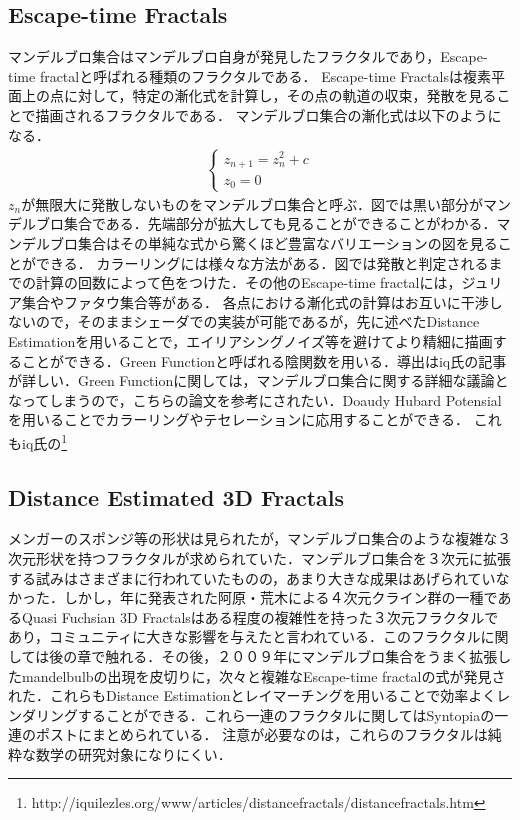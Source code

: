 \subsection{Escape-time Fractals}
マンデルブロ集合はマンデルブロ自身が発見したフラクタルであり，Escape-time fractalと呼ばれる種類のフラクタルである．
Escape-time Fractalsは複素平面上の点に対して，特定の漸化式を計算し，その点の軌道の収束，発散を見ることで描画されるフラクタルである．
マンデルブロ集合の漸化式は以下のようになる．
\begin{eqnarray*}
 \begin{cases}
  z_{n+1} = z^2_{n} + c \\ z_0 = 0
 \end{cases}
\end{eqnarray*}
$z_n$が無限大に発散しないものをマンデルブロ集合と呼ぶ．図では黒い部分がマンデルブロ集合である．先端部分が拡大しても見ることができることがわかる．マンデルブロ集合はその単純な式から驚くほど豊富なバリエーションの図を見ることができる．
カラーリングには様々な方法がある．図では発散と判定されるまでの計算の回数によって色をつけた．その他のEscape-time fractalには，ジュリア集合やファタウ集合等がある．
各点における漸化式の計算はお互いに干渉しないので，そのままシェーダでの実装が可能であるが，先に述べたDistance Estimationを用いることで，エイリアシングノイズ等を避けてより精細に描画することができる．Green Functionと呼ばれる陰関数を用いる．導出はiq氏の記事が詳しい．Green Functionに関しては，マンデルブロ集合に関する詳細な議論となってしまうので，こちらの論文を参考にされたい．Doaudy Hubard Potensialを用いることでカラーリングやテセレーションに応用することができる．
これもiq氏の\footnote{http://iquilezles.org/www/articles/distancefractals/distancefractals.htm}
\cite{mandelbrot}

\subsection{Distance Estimated 3D Fractals}
メンガーのスポンジ等の形状は見られたが，マンデルブロ集合のような複雑な３次元形状を持つフラクタルが求められていた．マンデルブロ集合を３次元に拡張する試みはさまざまに行われていたものの，あまり大きな成果はあげられていなかった．しかし，年に発表された阿原・荒木による４次元クライン群の一種であるQuasi Fuchsian 3D Fractalsはある程度の複雑性を持った３次元フラクタルであり，コミュニティに大きな影響を与えたと言われている．このフラクタルに関しては後の章で触れる．その後，２００９年にマンデルブロ集合をうまく拡張したmandelbulbの出現を皮切りに，次々と複雑なEscape-time fractalの式が発見された．これらもDistance Estimationとレイマーチングを用いることで効率よくレンダリングすることができる．これら一連のフラクタルに関してはSyntopiaの一連のポストにまとめられている．
注意が必要なのは，これらのフラクタルは純粋な数学の研究対象になりにくい．

